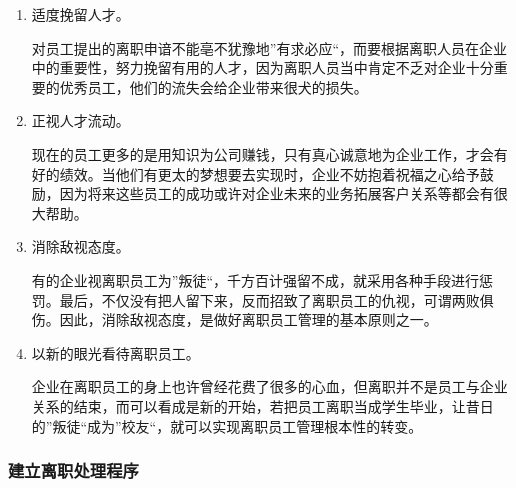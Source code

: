     \begin{enumerate}
        \item 适度挽留人才。

        对员工提出的离职申谙不能亳不犹豫地”有求必应“，而要根据离职人员在企业中的重要性，努力挽留有用的人才，因为离职人员当中肯定不乏对企业十分重要的优秀员工，他们的流失会给企业带来很犬的损失。

        \item 正视人才流动。

        现在的员工更多的是用知识为公司赚钱，只有真心诚意地为企业工作，才会有好的绩效。当他们有更太的梦想要去实现时，企业不妨抱着祝福之心给予鼓励，因为将来这些员工的成功或许对企业未来的业务拓展客户关系等都会有很大帮助。

        \item 消除敌视态度。

        有的企业视离职员工为”叛徒“，千方百计强留不成，就采用各种手段进行惩罚。最后，不仅没有把人留下来，反而招致了离职员工的仇视，可谓两败俱伤。因此，消除敌视态度，是做好离职员工管理的基本原则之一。

        \item 以新的眼光看待离职员工。

        企业在离职员工的身上也许曾经花费了很多的心血，但离职并不是员工与企业关系的结束，而可以看成是新的开始，若把员工离职当成学生毕业，让昔日的”叛徒“成为”校友“，就可以实现离职员工管理根本性的转变。
    \end{enumerate}

\subsubsection {建立离职处理程序}

